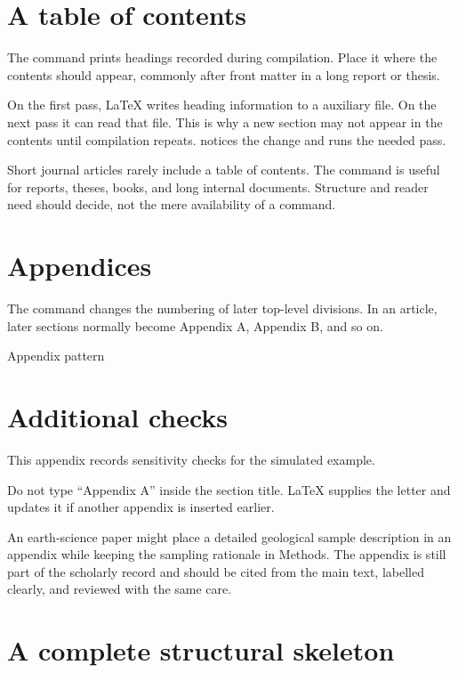 \section{A table of contents}

The command  prints headings recorded during compilation.
Place it where the contents should appear, commonly after front matter in a
long report or thesis.

On the first pass, \LaTeX{} writes heading information to a  auxiliary
file. On the next pass it can read that file. This is why a new section may not
appear in the contents until compilation repeats.  notices the
change and runs the needed pass.

Short journal articles rarely include a table of contents. The command is
useful for reports, theses, books, and long internal documents. Structure and
reader need should decide, not the mere availability of a command.

\section{Appendices}

The command  changes the numbering of later top-level divisions.
In an article, later sections normally become Appendix A, Appendix B, and so
on.

\begin{latexcode}{Appendix pattern}
\appendix
\section{Additional checks}
This appendix records sensitivity checks for the simulated example.
\end{latexcode}

Do not type ``Appendix A'' inside the section title. \LaTeX{} supplies the letter
and updates it if another appendix is inserted earlier.

\begin{scienceinpractice}
An earth-science paper might place a detailed geological sample description in
an appendix while keeping the sampling rationale in Methods. The appendix is
still part of the scholarly record and should be cited from the main text,
labelled clearly, and reviewed with the same care.
\end{scienceinpractice}

\section{A complete structural skeleton}

